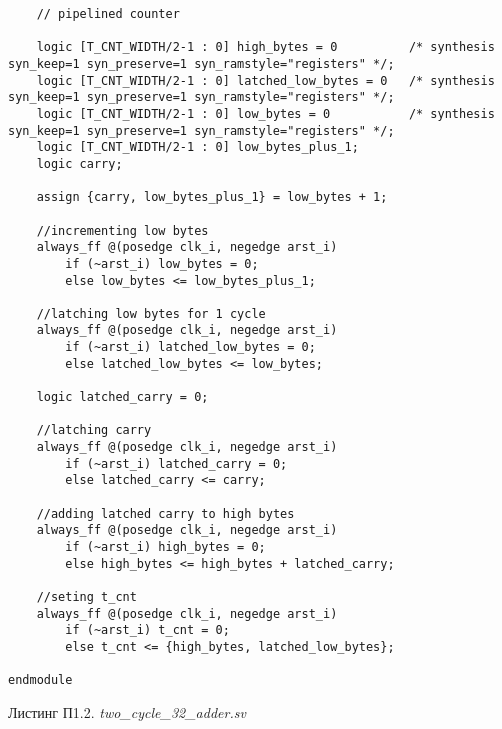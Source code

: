 \begin{lstlisting}
	// pipelined counter

	logic [T_CNT_WIDTH/2-1 : 0] high_bytes = 0 			/* synthesis syn_keep=1 syn_preserve=1 syn_ramstyle="registers" */;
	logic [T_CNT_WIDTH/2-1 : 0] latched_low_bytes = 0 	/* synthesis syn_keep=1 syn_preserve=1 syn_ramstyle="registers" */;
	logic [T_CNT_WIDTH/2-1 : 0] low_bytes = 0 			/* synthesis syn_keep=1 syn_preserve=1 syn_ramstyle="registers" */;
	logic [T_CNT_WIDTH/2-1 : 0] low_bytes_plus_1;
	logic carry;

	assign {carry, low_bytes_plus_1} = low_bytes + 1;

	//incrementing low bytes
	always_ff @(posedge clk_i, negedge arst_i) 
		if (~arst_i) low_bytes = 0;
		else low_bytes <= low_bytes_plus_1;

	//latching low bytes for 1 cycle
	always_ff @(posedge clk_i, negedge arst_i) 
		if (~arst_i) latched_low_bytes = 0;
		else latched_low_bytes <= low_bytes;

	logic latched_carry = 0;

	//latching carry
	always_ff @(posedge clk_i, negedge arst_i) 
		if (~arst_i) latched_carry = 0;
		else latched_carry <= carry;

	//adding latched carry to high bytes
	always_ff @(posedge clk_i, negedge arst_i)
		if (~arst_i) high_bytes = 0;
		else high_bytes <= high_bytes + latched_carry;

	//seting t_cnt
	always_ff @(posedge clk_i, negedge arst_i) 
		if (~arst_i) t_cnt = 0;
		else t_cnt <= {high_bytes, latched_low_bytes};

endmodule
\end{lstlisting}

\begin{flushright}
Листинг П1.2. \emph{two\_cycle\_32\_adder.sv}
\end{flushright}

